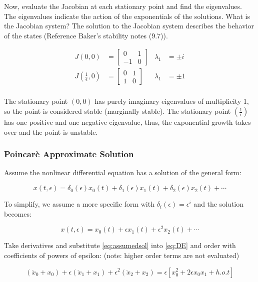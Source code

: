 Now, evaluate the Jacobian at each stationary point and find the eigenvalues. The eigenvalues indicate the action of the exponentials of the solutions. What is the Jacobian system? The solution to the Jacobian system describes the behavior of the states (Reference Baker's stability notes (9.7)). 

\begin{align*}
	J(0,0) &= \begin{bmatrix} 0 & 1 \\ -1 & 0 \end{bmatrix} & \lambda_1 &= \pm i \\
	J(\frac{1}{\epsilon},0) &= \begin{bmatrix} 0 & 1 \\ 1 & 0 \end{bmatrix} & \lambda_1 &= \pm 1 \\
\end{align*}

The stationary point $(0,0)$ has purely imaginary eigenvalues of multiplicity 1, so the point is considered stable (marginally stable). The stationary point $(\frac{1}{\epsilon})$ has one positive and one negative eigenvalue, thus, the exponential growth takes over and the point is unstable.

\subsubsection*{Poincar\`{e} Approximate Solution}

Assume the nonlinear differential equation has a solution of the general form:

\begin{equation*}
	x(t,\epsilon) = \delta_0(\epsilon)x_0(t)+\delta_1(\epsilon)x_1(t)+\delta_2(\epsilon)x_2(t)+\cdots
\end{equation*}

To simplify, we assume a more specific form with $\delta_i(\epsilon)=\epsilon^i$ and the solution becomes:

\begin{equation}
	\label{eq:assumedsol}
	x(t,\epsilon) = x_0(t)+\epsilon x_1(t)+\epsilon^2 x_2(t)+\cdots
\end{equation}

Take derivatives and substitute \eqref{eq:assumedsol} into \eqref{eq:DE} and order with coefficients of powers of epsilon: (note: higher order terms are not evaluated)

\begin{equation}
	(\ddot{x}_0+x_0)+\epsilon(\ddot{x}_1+x_1)+\epsilon^2(\ddot{x}_2+x_2) 
		= \epsilon\left[x_0^2+2\epsilon x_0x_1+ h.o.t \right ]
\end{equation}

